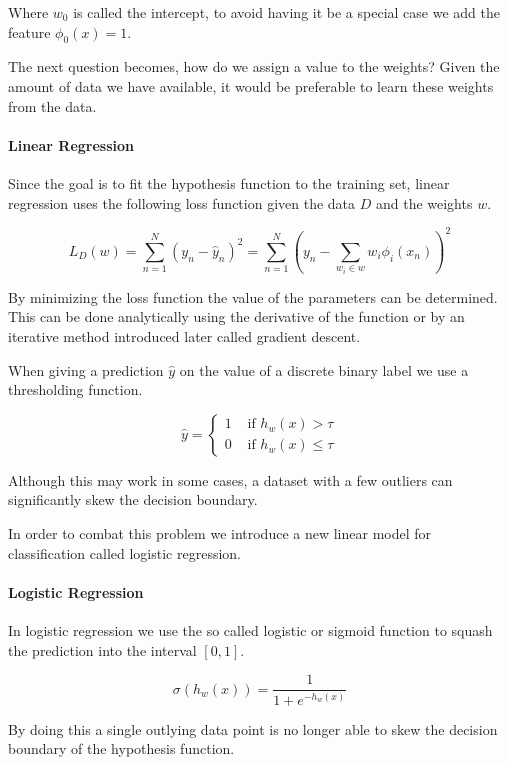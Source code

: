 Where $w_0$ is called the intercept, to avoid having it be a special case we add the feature $\phi_0(x)=1$.

The next question becomes, how do we assign a value to the weights?
Given the amount of data we have available, it would be preferable to learn these weights from the data. 

\paragraph{Linear Regression}
Since the goal is to fit the hypothesis function to the training set, linear regression uses the following loss function given the data $D$ and the weights $w$.

$$ L_D(w) = \sum_{n=1}^N (y_n-\hat{y}_n)^2 = \sum_{n=1}^N (y_n - \sum_{w_i \in w} w_i \phi_i(x_n))^2 $$ 
    
By minimizing the loss function the value of the parameters can be determined.
This can be done analytically using the derivative of the function or by an iterative method introduced later called gradient descent.

When giving a prediction $\hat{y}$ on the value of a discrete binary label we use a thresholding function.

$$\hat{y} = \begin{cases}
	1 &\text{ if } h_w(x) > \tau \\
	0 &\text{ if } h_w(x) \leq \tau  %
\end{cases}$$ 

Although this may work in some cases, a dataset with a few outliers can significantly skew the decision boundary.

In order to combat this problem we introduce a new linear model for classification called logistic regression.

\paragraph{Logistic Regression}\label{sec:logistic}

In logistic regression we use the so called logistic or sigmoid function to squash the prediction into the interval $[0,1]$.

\[ \sigma(h_w(x)) = \frac{1}{1+e^{-h_w(x)}} \]

By doing this a single outlying data point is no longer able to skew the decision boundary of the hypothesis function.

